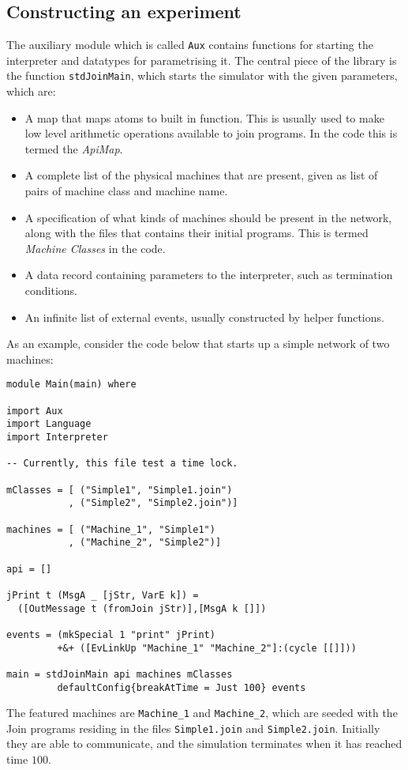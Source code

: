 \subsection{Constructing an experiment}
The auxiliary module which is called \texttt{Aux} contains functions for
starting the interpreter and datatypes for parametrising it. The central piece
of the library is the function \texttt{stdJoinMain}, which starts the simulator
with the given parameters, which are:

\begin{itemize}

\item A map that maps atoms to built in function. This is usually used to make
low level arithmetic operations available to join programs. In the code this is
termed the \emph{ApiMap}.

\item A complete list of the physical machines that are present, given as list
of pairs of machine class and machine name.

\item A specification of what kinds of machines should be present in the
network, along with the files that contains their initial programs. This is
termed \emph{Machine Classes} in the code.

\item A data record containing parameters to the interpreter, such as
termination conditions.

\item An infinite list of external events, usually constructed by helper
functions.

\end{itemize}

As an example, consider the code below that starts up a simple network of two
machines:
\begin{verbatim}
module Main(main) where

import Aux
import Language
import Interpreter

-- Currently, this file test a time lock.

mClasses = [ ("Simple1", "Simple1.join")
           , ("Simple2", "Simple2.join")]

machines = [ ("Machine_1", "Simple1")
           , ("Machine_2", "Simple2")]

api = []

jPrint t (MsgA _ [jStr, VarE k]) =
  ([OutMessage t (fromJoin jStr)],[MsgA k []])

events = (mkSpecial 1 "print" jPrint)
         +&+ ([EvLinkUp "Machine_1" "Machine_2"]:(cycle [[]]))

main = stdJoinMain api machines mClasses
         defaultConfig{breakAtTime = Just 100} events
\end{verbatim}

The featured machines are \texttt{Machine\_1} and \texttt{Machine\_2}, which are
seeded with the Join programs residing in the files \texttt{Simple1.join} and
\texttt{Simple2.join}. Initially they are able to communicate, and the
simulation terminates when it has reached time $100$.

